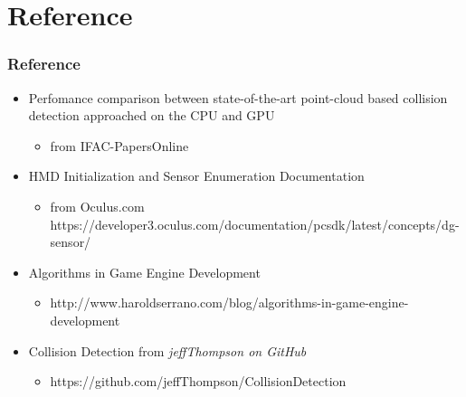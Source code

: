\documentclass{beamer}
\begin{document}
\section{Reference}

\begin{frame}
\frametitle{Reference}
\begin{itemize}
	\item Perfomance comparison between state-of-the-art point-cloud based collision detection approached on the CPU and GPU
		\begin{itemize}
			\item from IFAC-PapersOnline
		\end{itemize}
	\item HMD Initialization and Sensor Enumeration Documentation
		\begin{itemize}
			\item from Oculus.com \\
			https://developer3.oculus.com/documentation/pcsdk/latest/concepts/dg-sensor/
		\end{itemize}
	\item Algorithms in Game Engine Development
		\begin{itemize}
			\item http://www.haroldserrano.com/blog/algorithms-in-game-engine-development
		\end{itemize}
	\item Collision Detection from \it{jeffThompson} on GitHub
		\begin{itemize}
			\item https://github.com/jeffThompson/CollisionDetection
		\end{itemize}
\end{itemize}
\end{frame}
\end{document}
